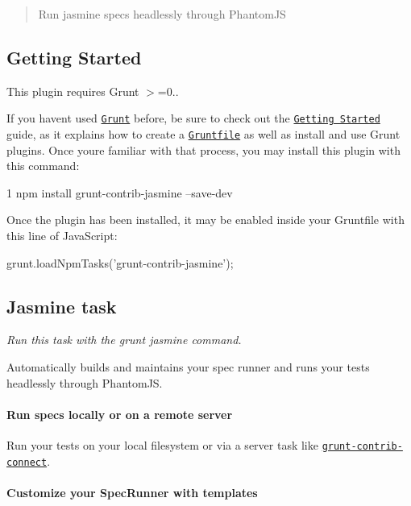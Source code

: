 \begin{quote}
Run jasmine specs headlessly through Phantom\+J\+S \end{quote}


\subsection*{Getting Started}

This plugin requires Grunt {\ttfamily $>$=0..}

If you haven\textquotesingle{}t used \href{http://gruntjs.com/}{\tt Grunt} before, be sure to check out the \href{http://gruntjs.com/getting-started}{\tt Getting Started} guide, as it explains how to create a \href{http://gruntjs.com/sample-gruntfile}{\tt Gruntfile} as well as install and use Grunt plugins. Once you\textquotesingle{}re familiar with that process, you may install this plugin with this command\+:


\begin{DoxyCode}
1 npm install grunt-contrib-jasmine --save-dev
\end{DoxyCode}


Once the plugin has been installed, it may be enabled inside your Gruntfile with this line of Java\+Script\+:


\begin{DoxyCode}
grunt.loadNpmTasks(\textcolor{stringliteral}{'grunt-contrib-jasmine'});
\end{DoxyCode}


\subsection*{Jasmine task}

{\itshape Run this task with the {\ttfamily grunt jasmine} command.}

Automatically builds and maintains your spec runner and runs your tests headlessly through Phantom\+J\+S.

\paragraph*{Run specs locally or on a remote server}

Run your tests on your local filesystem or via a server task like \href{https://github.com/gruntjs/grunt-contrib-connect}{\tt grunt-\/contrib-\/connect}.

\paragraph*{Customize your Spec\+Runner with templates}

